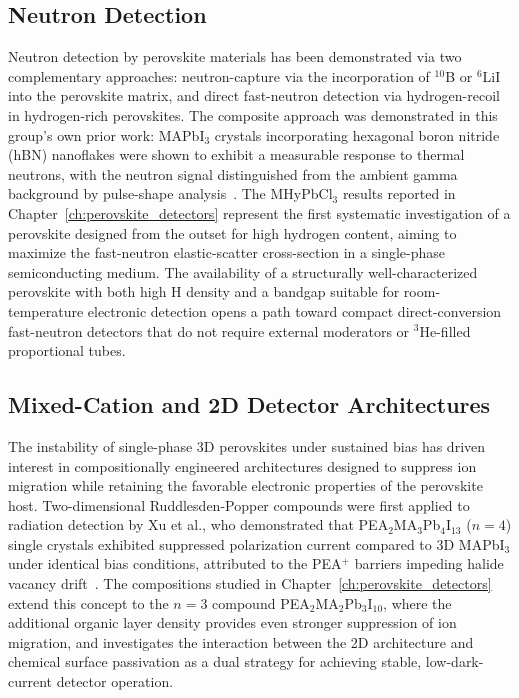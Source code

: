 \subsection{Neutron Detection}

Neutron detection by perovskite materials has been demonstrated via
two complementary approaches: neutron-capture via the incorporation
of $^{10}$B or $^6$LiI into the perovskite matrix, and direct fast-neutron
detection via hydrogen-recoil in hydrogen-rich perovskites.  The
composite approach was demonstrated in this group's own prior work:
MAPbI$_3$ crystals incorporating hexagonal boron nitride (hBN)
nanoflakes were shown to exhibit a measurable response to thermal
neutrons, with the neutron signal distinguished from the ambient gamma
background by pulse-shape analysis~\cite{Panaccione_NIM_2024}.  The
MHyPbCl$_3$ results reported in Chapter~\ref{ch:perovskite_detectors} represent
the first systematic investigation of a perovskite designed from the
outset for high hydrogen content, aiming to maximize the fast-neutron
elastic-scatter cross-section in a single-phase semiconducting medium.
The availability of a structurally well-characterized perovskite with
both high H density and a bandgap suitable for room-temperature
electronic detection opens a path toward compact direct-conversion
fast-neutron detectors that do not require external moderators or
$^3$He-filled proportional tubes.

\subsection{Mixed-Cation and 2D Detector Architectures}

The instability of single-phase 3D perovskites under sustained bias
has driven interest in compositionally engineered architectures designed
to suppress ion migration while retaining the favorable electronic
properties of the perovskite host.  Two-dimensional Ruddlesden-Popper
compounds were first applied to radiation detection by Xu et al., who
demonstrated that PEA$_2$MA$_3$Pb$_4$I$_{13}$ ($n = 4$) single crystals
exhibited suppressed polarization current compared to 3D MAPbI$_3$
under identical bias conditions, attributed to the PEA$^+$ barriers
impeding halide vacancy drift~\cite{Xu2020}.  The compositions studied
in Chapter~\ref{ch:perovskite_detectors} extend this concept to the $n = 3$
compound PEA$_2$MA$_2$Pb$_3$I$_{10}$, where the additional organic
layer density provides even stronger suppression of ion migration, and
investigates the interaction between the 2D architecture and chemical
surface passivation as a dual strategy for achieving stable, low-dark-current
detector operation.

